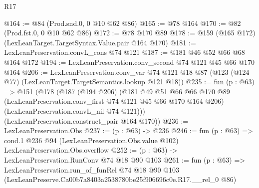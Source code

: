 \begin{lexlean}{R17}
\begin{coremodule}
@164 := @84 (Prod.snd.{0, 0} @10 @62 @86)
@165 := @78 @164
@170 := @82 (Prod.fst.{0, 0} @10 @62 @86)
@172 := @78 @170 @89
@178 := @159 (@165 @172) (LexLeanTarget.TargetSyntax.Value.pair @164 @170)
@181 := LexLeanPreservation.convL_cons @74 @121
@187 := @181 @46 @52 @66 @68 @164 @172
@194 := LexLeanPreservation.conv_second @74 @121 @45 @66 @170 @164
@206 := LexLeanPreservation.conv_var
    @74
    @121
    @18
    @87
    (@123 (@124 @77) (LexLeanTarget.TargetSemantics.lookup @121 @18))
@235 := fun (p : @63) =>
  @151
    (@178
      (@187
        (@194 @206)
        (@181
          @49
          @51
          @66
          @66
          @170
          @89
          (LexLeanPreservation.conv_first @74 @121 @45 @66 @170 @164 @206)
          (LexLeanPreservation.convL_nil @74 @121)))
      (LexLeanPreservation.construct_pair @164 @170))
@236 := LexLeanPreservation.Obs
@237 := (p : @63) -> @236
@246 := fun (p : @63) =>
  cond.{1} @236 @94 (LexLeanPreservation.Obs.value @102) LexLeanPreservation.Obs.overflow
@252 := (p : @63) -> LexLeanPreservation.RunConv @74 @18 @90 @103
@261 := fun (p : @63) =>
  LexLeanPreservation.run_of_funRel
    @74
    @18
    @90
    @103
    (LexLeanPreserve.Ca00b7a8403a2538780be25f906696c0e.R17.__rel_0 @86)
\end{coremodule}
\end{lexlean}
